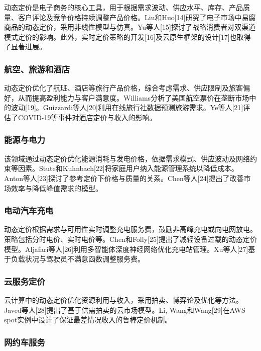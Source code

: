 动态定价是电子商务的核心工具，用于根据需求波动、供应水平、库存、产品质量、客户评论及竞争价格持续调整产品价格。Liu和Huo[14]研究了电子市场中易腐商品的动态定价，采用非线性模型与仿真。Yu等人[15]探讨了战略消费者对双渠道模式定价的影响。此外，实时定价策略的开发[16]及云原生框架的设计[17]也取得了显著进展。

\subsubsection{航空、旅游和酒店}\label{b.-airline-travel-and-hotels}

动态定价优化了航班、酒店等旅行产品价格，综合考虑需求、供应限制及旅客偏好，从而提高盈利能力与客户满意度。Williams分析了美国航空票价在垄断市场中的波动[19]。Guizzardi等人[20]利用在线旅行社数据预测旅游需求。Ye等人[21]评估了COVID-19等事件对酒店定价与收入的影响。

\subsubsection{能源与电力}\label{c.-energy-and-electricity}

该领域通过动态定价优化能源消耗与发电价格，依据需求模式、供应波动及网络约束等因素。Stute和Kuhnbach[22]将家庭用户纳入能源管理系统以降低成本。Anton等人[23]探讨了参考定价下价格与质量的关系。Chen等人[24]提出了改善市场效率与降低峰值需求的模型。

\subsubsection{电动汽车充电}\label{d.-electric-vehicle-charging}

动态定价根据需求与可用性实时调整充电服务费，鼓励非高峰充电或向电网放电。策略包括分时电价、实时电价等。Chen和Folly[25]提出了减轻设备过载的动态定价模型。Aljafari等人[26]利用多智能体深度神经网络优化充电站管理。Xu等人[27]基于负载状况与驾驶员不满意函数调整服务费。

\subsubsection{云服务定价}\label{e.-cloud-service-pricing}

云计算中的动态定价优化资源利用与收入，采用拍卖、博弈论及优化等方法。Javed等人[28]提出了基于供需拍卖的云市场模型。Li, Wang和Wang[29]在AWS spot实例中设计了保证最差情况收入的鲁棒定价机制。

\subsubsection{网约车服务}\label{f.-taxi-services-e.g.-uber-ola-lyft}

